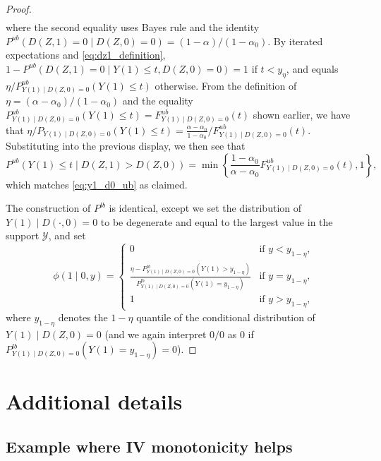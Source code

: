 \documentclass[12pt]{article}%
\theoremstyle{definition}
\newcommand\1{\operatorname{I}\indicatorfence}
\begin{document}
\begin{appendices}
\begin{proof}
\begin{multline*}
  \end{multline*}
  where the second equality uses Bayes rule and the identity
  $P^{ub}(D(Z,1)=0\mid D(Z,0)=0)=(1-\alpha)/(1-\alpha_{0})$. By iterated
  expectations and \cref{eq:dz1_definition},
  $1-P^{ub}(D(Z,1)=0 \mid Y(1) \leq t, D(Z,0) =0)=1$ if $t< y_{\eta}$,
  and equals $\eta/P^{ub}_{Y(1)\mid D(Z,0)=0}(Y(1)\leq t)$ otherwise. From the definition of $\eta=(\alpha-\alpha_{0})/(1-\alpha_{0})$ and the equality $P^{ub}_{Y(1)\mid D(Z,0)=0}(Y(1)\leq t) = F^{ub}_{Y(1)\mid D(Z, 0)=0}(t)$ shown earlier, we have that $\eta/P_{Y(1)\mid D(Z,0)=0}(Y(1)\leq
  t)=\frac{\alpha-\alpha_{0}}{1-\alpha_{0}} / F^{ub}_{Y(1)\mid D(Z, 0)=0}(t)$. Substituting into the previous display, we then see that  \begin{equation*}
    P^{ub}(Y(1) \leq t \mid D(Z,1)> D(Z,0))=\min\left\{\frac{1-\alpha_{0}}{\alpha-\alpha_{0}}F^{ub}_{Y(1)\mid D(Z,0)=0}(t),1\right\},
  \end{equation*}
  which matches \cref{eq:y1_d0_ub} as claimed.

  The construction of $P^{lb}$ is identical, except we set the distribution of
  $Y(1)\mid D(\cdot,0)=0$ to be degenerate and equal to the largest value in the
  support $\mathcal{Y}$, and set
  \begin{equation*}
    \phi(1 \mid 0,y)=
    \begin{cases}
      0 & \text{if $y < y_{1-\eta}$,} \\
      \frac{\eta-P^{lb}_{Y(1)\mid D(Z,0)=0}(Y(1)>y_{1-\eta})}{
      P^{lb}_{Y(1)\mid D(Z,0)=0}(Y(1)=y_{1-\eta})} & \text{if $y=y_{1-\eta}$,}\\
      1 & \text{if $y>y_{1-\eta}$,}
    \end{cases}
  \end{equation*}
  where $y_{1-\eta}$ denotes the $1-\eta$ quantile of the conditional
  distribution of $Y(1)\mid D(Z,0)=0$ (and we again interpret $0/0$ as $0$ if
  $P^{lb}_{Y(1)\mid D(Z,0)=0}(Y(1)=y_{1-\eta})=0$).
\end{proof}

\section{Additional details}\label{sec:addit-deta-empir}

\subsection{Example where IV monotonicity helps}\label{sec:monotonicity_helps}


\end{appendices}
\end{document}
